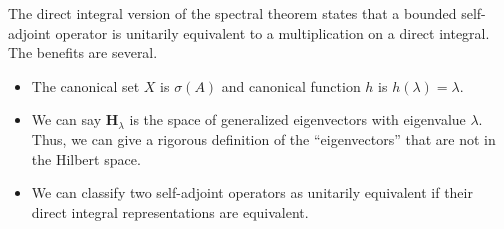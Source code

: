 \documentclass[10pt]{extarticle}
\theoremstyle{plain}
\theoremstyle{definition}
\theoremstyle{remark}
\begin{document}
  The direct integral version of the spectral theorem states that a bounded self-adjoint operator is unitarily equivalent to a multiplication on a direct integral. The benefits are several.
  \begin{itemize}
    \item The canonical set $X$ is $\sigma(A)$ and canonical function $h$ is $h(\lambda) = \lambda$.
    \item We can say $\mathbf{H}_{\lambda}$ is the space of generalized eigenvectors with eigenvalue $\lambda$. Thus, we can give a rigorous definition of the ``eigenvectors'' that are not in the Hilbert space.
    \item We can classify two self-adjoint operators as unitarily equivalent if their direct integral representations are equivalent.
  \end{itemize}
\end{document}
